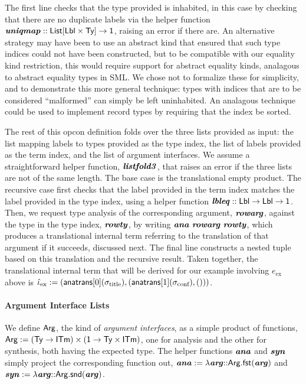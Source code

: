 \documentclass[10pt,preprint]{sigplanconf}
\begin{document}
The first line checks that the type provided is inhabited, in this case by checking that there are no duplicate labels via the helper function ${\textbf{\textit{uniqmap}}} :: {\sf List}[{\sf Lbl} \times {\sf Ty}]\rightarrow {\sf 1}$, raising an error if there are. An alternative strategy may have been to use an abstract kind that ensured that such type indices could not have been constructed, but to be compatible with our equality kind restriction, this would require support for abstract equality kinds, analagous to abstract equality types in SML. We chose not to formalize these for simplicity, and to demonstrate this more general technique: types with indices that are to be considered ``malformed'' can simply be left uninhabited. An analagous technique could be used to implement record types by requiring that the index be sorted.%

The rest of this opcon definition folds over the three lists provided as input: the list mapping labels to types provided as the type index, the list of labels provided as the term index, and the list of argument interfaces. We assume a straightforward helper function, ${\textbf{\textit{listfold3}}}$, that raises an error if the three lists are not of the same length. The base case is the translational empty product. The recursive case first checks that the label provided in the term index matches the label provided in the type index, using a helper function ${\textbf{\textit{lbleq}}} :: {\sf Lbl} \rightarrow {\sf Lbl} \rightarrow {\sf 1}$. Then, we request type analysis of the corresponding argument, ${\textbf{\textit{rowarg}}}$,  against the type in the type index, ${\textbf{\textit{rowty}}}$, by writing ${\textbf{\textit{ana}}}~{\textbf{\textit{rowarg}}}~{\textbf{\textit{rowty}}}$, which  produces a translational internal term  referring to the translation of that argument if it succeeds, discussed next. The final line constructs a nested tuple based on this translation and the recursive result. Taken together, the translational internal term that will be derived for our example involving $e_\text{ex}$ above is $\small\qitm_\text{ex} := (\anatrans{0}{\stx{title}}, (\anatrans{1}{\stx{conf}}, ()))$.

\paragraph{Argument Interface Lists} We define ${\sf Arg}$, the kind of \emph{argument interfaces}, as a simple product of functions, ${\sf Arg} := ({\sf Ty} \rightarrow {\sf ITm}) \times ({\sf 1} \rightarrow {\sf Ty}\times{\sf ITm})$, one for analysis and the other for synthesis, both having the expected type. The helper functions ${\textbf{\textit{ana}}}$ and ${\textbf{\textit{syn}}}$ simply project the corresponding function out, ${\textbf{\textit{ana}}} := \lambda {\textbf{\textit{arg}}}{::}{\sf Arg}.{\sf fst}({\textbf{\textit{arg}}})$ and ${\textbf{\textit{syn}}}  :=  \lambda {\textbf{\textit{arg}}}{::}{\sf Arg}.{\sf snd}({\textbf{\textit{arg}}})$. 
\end{document}
